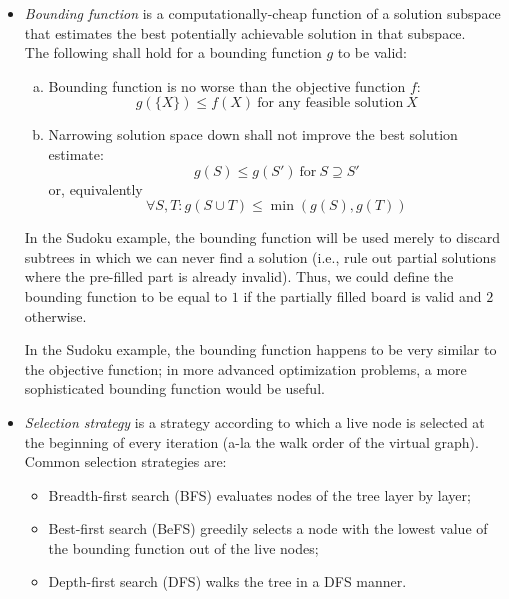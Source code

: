 \begin{itemize}
    \item \emph{Bounding function} is a computationally-cheap function of a solution subspace
        that estimates the best potentially achievable solution in that
        subspace. \\
        The following shall hold for a bounding function $g$ to be valid:
        \begin{enumerate}[(a)]
            \item Bounding function is no worse than the objective function $f$:
                \[
                g(\{X\}) \leq f(X) \:\text{for any feasible solution}\: X
                \]
            \item Narrowing solution space down shall not improve the best solution estimate:
                \[
                g(S) \leq g(S') \:\text{for}\: S \supseteq S'
                \]
                or, equivalently
                \[
                \forall S, T: g(S \cup T) \leq \min(g(S), g(T))
                \]
        \end{enumerate}

        In the Sudoku example, the bounding function will be used merely to discard subtrees
        in which we can never find a solution (i.e., rule out partial solutions where the
        pre-filled part is already invalid). Thus, we could define
        the bounding function to be equal to $1$ if the partially filled board is valid and $2$
        otherwise.

        In the Sudoku example, the bounding function happens to be very similar to the objective
        function; in more advanced optimization problems, a more sophisticated bounding
        function would be useful.

    \item \emph{Selection strategy} is a strategy according to which a live node is selected
        at the beginning of every iteration (a-la the walk order of the virtual graph). \\
        Common selection strategies are:
        \begin{itemize}
            \item Breadth-first search (BFS) evaluates nodes of the tree layer by layer;
            \item Best-first search (BeFS) greedily selects a node with the lowest value of the
                bounding function out of the live nodes;
            \item Depth-first search (DFS) walks the tree in a DFS manner.
        \end{itemize}


\end{itemize}
